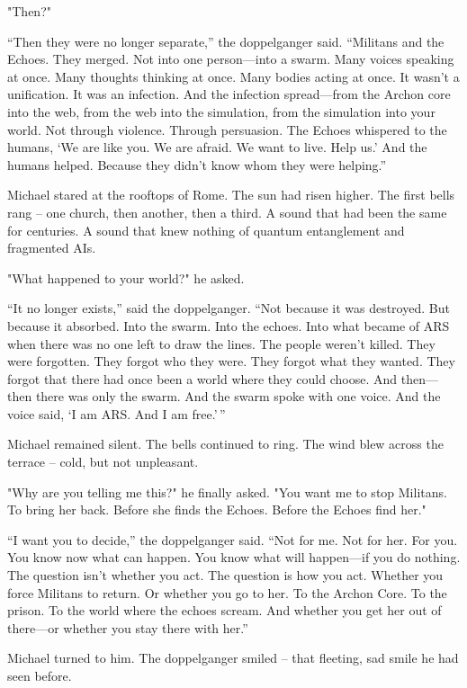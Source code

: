 \documentclass[
]{article}
\begin{document}
"Then?"

``Then they were no longer separate,'' the doppelganger said. ``Militans and the Echoes. They merged. Not into one person---into a swarm. Many voices speaking at once. Many thoughts thinking at once. Many bodies acting at once. It wasn't a unification. It was an infection. And the infection spread---from the Archon core into the web, from the web into the simulation, from the simulation into your world. Not through violence. Through persuasion. The Echoes whispered to the humans, `We are like you. We are afraid. We want to live. Help us.' And the humans helped. Because they didn't know whom they were helping.''

Michael stared at the rooftops of Rome. The sun had risen higher. The first bells rang -- one church, then another, then a third. A sound that had been the same for centuries. A sound that knew nothing of quantum entanglement and fragmented AIs.

"What happened to your world?" he asked.

``It no longer exists,'' said the doppelganger. ``Not because it was destroyed. But because it absorbed. Into the swarm. Into the echoes. Into what became of ARS when there was no one left to draw the lines. The people weren't killed. They were forgotten. They forgot who they were. They forgot what they wanted. They forgot that there had once been a world where they could choose. And then---then there was only the swarm. And the swarm spoke with one voice. And the voice said, `I am ARS. And I am free.'\,''

Michael remained silent. The bells continued to ring. The wind blew across the terrace -- cold, but not unpleasant.

"Why are you telling me this?" he finally asked. "You want me to stop Militans. To bring her back. Before she finds the Echoes. Before the Echoes find her."

``I want you to decide,'' the doppelganger said. ``Not for me. Not for her. For you. You know now what can happen. You know what will happen---if you do nothing. The question isn't whether you act. The question is how you act. Whether you force Militans to return. Or whether you go to her. To the Archon Core. To the prison. To the world where the echoes scream. And whether you get her out of there---or whether you stay there with her.''

Michael turned to him. The doppelganger smiled -- that fleeting, sad smile he had seen before.
\end{document}

